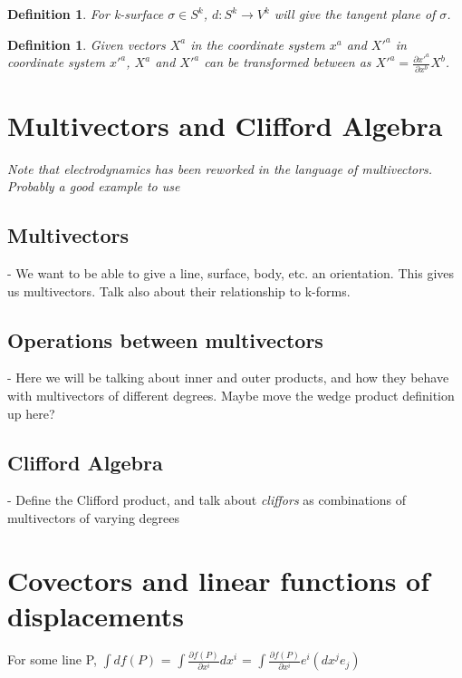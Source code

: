 \documentclass{book}
\newtheorem{defn}[equation]{Definition}
\begin{document}
\begin{defn}
	For k-surface $\sigma \in S^k$, $d : S^k \to V^k$ will give the tangent plane of $\sigma$. 
\end{defn}

\begin{defn}
	Given vectors $X^a$ in the coordinate system $x^a$ and $X'^a$ in coordinate system $x'^a$, $X^a$ and $X'^a$ can be transformed between as $X'^a = \frac{\partial x'^a}{\partial x^b} X^b$. 
\end{defn}



\section{Multivectors and Clifford Algebra}

\emph{Note that electrodynamics has been reworked in the language of multivectors. Probably a good example to use}

\subsection{Multivectors}

- We want to be able to give a line, surface, body, etc. an orientation. This gives us multivectors. Talk also about their relationship to k-forms. 

\subsection{Operations between multivectors}

- Here we will be talking about inner and outer products, and how they behave with multivectors of different degrees. Maybe move the wedge product definition up here? 

\subsection{Clifford Algebra}

- Define the Clifford product, and talk about \emph{cliffors} as combinations of multivectors of varying degrees 


\section{Covectors and linear functions of displacements}

For some line P, $\int df(P)$ = $\int \frac{\partial f(P)}{{\partial x^i}} dx^i$ = $\int \frac{{\partial f(P)}}{{\partial x^i}} e^i (dx^j e_j)$
\end{document}

